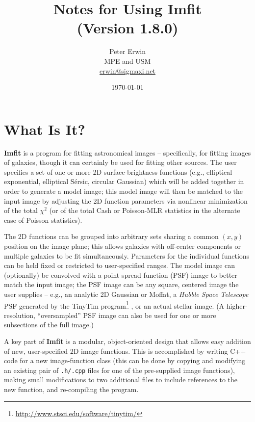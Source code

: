 \documentclass[10pt,a4paper,article]{memoir}
\newcommand{\imfit}{\textbf{Imfit}}
\newcommand{\Imfit}{\textbf{Imfit}}
\newcommand{\chisquare}{\ensuremath{\chi^{2}}}
\newcommand{\versionnum}{1.8.0}
\begin{document}
\title{
  Notes for Using Imfit \\
  (Version \versionnum{})
}
\author{
  Peter Erwin\\
  MPE and USM\\
  \href{mailto:erwin@sigmaxi.net}{erwin@sigmaxi.net}
}
\date{\today}  %

\maketitle

\tableofcontents


\newpage

\chapter{What Is It?}

\Imfit{} is a program for fitting astronomical images -- specifically,
for fitting images of galaxies, though it can certainly be used for
fitting other sources. The user specifies a set of one or more 2D
surface-brightness functions (e.g., elliptical exponential, elliptical
S\'ersic, circular Gaussian) which will be added together in order to
generate a model image; this model image will then be matched to the
input image by adjusting the 2D function parameters via nonlinear
minimization of the total \chisquare{} (or of the total Cash or
Poisson-MLR statistics in the alternate case of Poisson statistics).

The 2D functions can be grouped into arbitrary sets sharing a common $(x,y)$
position on the image plane; this allows galaxies with off-center components
or multiple galaxies to be fit simultaneously. Parameters for the individual
functions can be held fixed or restricted to user-specified ranges. The
model image can (optionally) be convolved with a point spread
function (PSF) image to better match the input image; the PSF image can
be any square, centered image the user supplies -- e.g., an analytic 2D Gaussian
or Moffat, a \textit{Hubble Space Telescope} PSF generated by the TinyTim
program\footnote{\url{http://www.stsci.edu/software/tinytim/}} \citep{krist95}, 
or an actual stellar image. (A higher-resolution, ``oversampled'' PSF image
can also be used for one or more subsections of the full image.) 

A key part of \imfit{} is a modular, object-oriented design that allows easy
addition of new, user-specified 2D image functions. This is accomplished by
writing C++ code for a new image-function class (this can be done by copying and
modifying an existing pair of \texttt{.h/.cpp} files for one of the pre-supplied
image functions), making small modifications to two additional files to include
references to the new function, and re-compiling the program.
\end{document}
